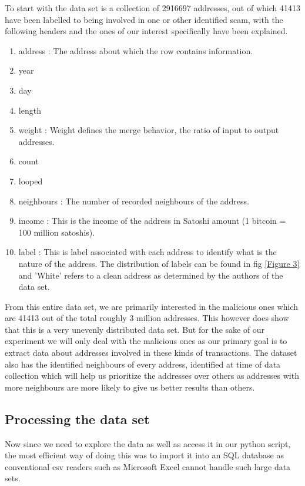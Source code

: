\documentclass{article}
\begin{document}
        To start with the data set is a collection of 2916697 addresses, out of which 41413 have been labelled to being involved in one or other identified scam, with the following headers and the ones of our interest specifically have been explained.
        \begin{enumerate}
            \item address : The address about which the row contains information.
            \item year
            \item day
            \item length 
            \item weight : Weight defines the merge behavior, the ratio of input to output addresses.
            \item count 
            \item looped
            \item neighbours : The number of recorded neighbours of the address.
            \item income : This is the income of the address in Satoshi amount (1 bitcoin = 100 million satoshis).
            \item label : This is label associated with each address to identify what is the nature of the address. The distribution of labels can be found in fig \ref{Figure 3} and 'White' refers to a clean address as determined by the authors of the data set.
        \end{enumerate}
        
        From this entire data set, we are primarily interested in the malicious ones which are 41413 out of the total roughly 3 million addresses. This however does show that this is a very unevenly distributed data set. But for the sake of our experiment we will only deal with the malicious ones as our primary goal is to extract data about addresses involved in these kinds of transactions. The dataset also has the identified neighbours of every address, identified at time of data collection which will help us prioritize the addresses over others as addresses with more neighbours are more likely to give us better results than others.

\pagebreak

    \subsection{Processing the data set}
        Now since we need to explore the data as well as access it in our python script, the most efficient way of doing this was to import it into an SQL database as conventional csv readers such as Microsoft Excel cannot handle such large data sets. 
        
\end{document}
